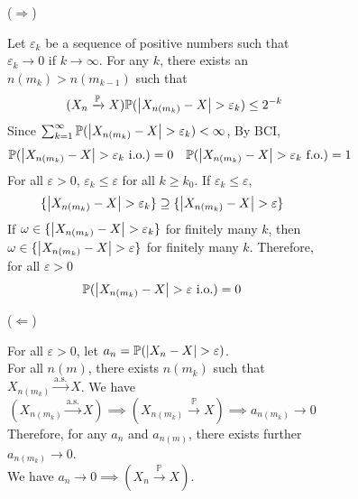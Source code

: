 \documentclass{huhtakm-template-book}
\newcommand{\prob}{\mathbb{P}}
\begin{document}
\begin{proofing}
	\begin{figure}[h!]
		\begin{subfigure}[b]{0.05\textwidth}
			($\Longrightarrow$)
		\end{subfigure}
		\begin{subfigure}[t]{0.9\textwidth}
			Let $\varepsilon_{k}$ be a sequence of positive numbers such that $\varepsilon_{k}\to 0$ if $k\to\infty$. For any $k$, there exists an $n(m_{k})>n(m_{k-1})$ such that
			\begin{equation*}
				\tag{$X_{n}\xrightarrow{\prob}X$}
				\prob(\abs{X_{n(m_{k})}-X}>\varepsilon_{k})\leq 2^{-k}
			\end{equation*}
			Since $\sum_{k=1}^{\infty}\prob(\abs{X_{n(m_{k})}-X}>\varepsilon_{k})<\infty$, By BCI,
			\begin{align*}
				\prob(\abs{X_{n(m_{k})}-X}>\varepsilon_{k}\text{ i.o.})&=0 & \prob(\abs{X_{n(m_{k})}-X}>\varepsilon_{k}\text{ f.o.})&=1
			\end{align*}
			For all $\varepsilon>0$, $\varepsilon_{k}\leq\varepsilon$ for all $k\geq k_{0}$. If $\varepsilon_{k}\leq\varepsilon$,
			\begin{equation*}
				\{\abs{X_{n(m_{k})}-X}>\varepsilon_{k}\}\supseteq\{\abs{X_{n(m_{k})}-X}>\varepsilon\}
			\end{equation*}
			If $\omega\in\{\abs{X_{n(m_{k})}-X}>\varepsilon_{k}\}$ for finitely many $k$, then $\omega\in\{\abs{X_{n(m_{k})}-X}>\varepsilon\}$ for finitely many $k$. Therefore, for all $\varepsilon >0$
			\begin{equation*}
				\prob(\abs{X_{n(m_{k})}-X}>\varepsilon\text{ i.o.})=0
			\end{equation*}
		\end{subfigure}
	\end{figure}
	\begin{figure}[h!]
		\begin{subfigure}[b]{0.05\textwidth}
			($\Longleftarrow$)
		\end{subfigure}
		\begin{subfigure}[t]{0.9\textwidth}
			For all $\varepsilon>0$, let $a_{n}=\prob(\abs{X_{n}-X}>\varepsilon)$.\\
			For all $n(m)$, there exists $n(m_{k})$ such that $X_{n(m_{k})}\xrightarrow{\text{a.s.}}X$. We have
			\begin{equation*}
				(X_{n(m_{k})}\xrightarrow{\text{a.s.}}X)\implies(X_{n(m_{k})}\xrightarrow{\prob}X)\implies a_{n(m_{k})}\to 0
			\end{equation*}
			Therefore, for any $a_{n}$ and $a_{n(m)}$, there exists further $a_{n(m_{k})}\to 0$.\\
			We have $a_{n}\to 0\implies(X_{n}\xrightarrow{\prob}X)$.
		\end{subfigure}
	\end{figure}
\end{proofing}
\end{document}

